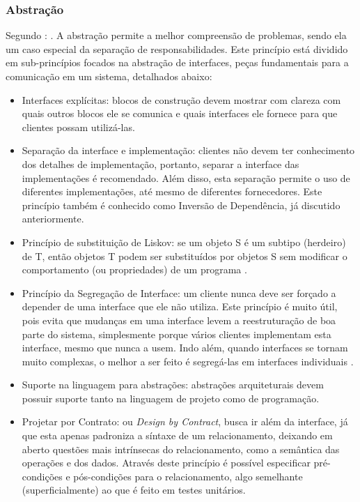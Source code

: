 \documentclass[diss]{template/setrem}
\begin{document}
\subsubsection{Abstração}
Segundo \citet[p. 131]{Vogel2011}: . A abstração permite a melhor compreensão de problemas, sendo ela um caso especial da separação de responsabilidades. Este princípio está dividido em sub-princípios focados na abstração de interfaces, peças fundamentais para a comunicação em um sistema, detalhados abaixo:
\begin{itemize}
	\item Interfaces explícitas: blocos de construção devem mostrar com clareza com quais outros blocos ele se comunica e quais interfaces ele fornece para que clientes possam utilizá-las.
	\item Separação da interface e implementação: clientes não devem ter conhecimento dos detalhes de implementação, portanto, separar a interface das implementações é recomendado. Além disso, esta separação permite o uso de diferentes implementações, até mesmo de diferentes fornecedores. Este princípio também é conhecido como Inversão de Dependência, já discutido anteriormente.
	\item Princípio de substituição de Liskov: se um objeto S é um subtipo (herdeiro) de T, então objetos T podem ser substituídos por objetos S sem modificar o comportamento (ou propriedades) de um programa \citep{Martin1996}.
	\item Princípio da Segregação de Interface: um cliente nunca deve ser forçado a depender de uma interface que ele não utiliza. Este princípio é muito útil, pois evita que mudanças em uma interface levem a reestruturação de boa parte do sistema, simplesmente porque vários clientes implementam esta interface, mesmo que nunca a usem. Indo além, quando interfaces se tornam muito complexas, o melhor a ser feito é segregá-las em interfaces individuais \citep{Martin1996a}.
	\item Suporte na linguagem para abstrações: abstrações arquiteturais devem possuir suporte tanto na linguagem de projeto como de programação.
	\item Projetar por Contrato: ou \emph{Design by Contract}, busca ir além da interface, já que esta apenas padroniza a síntaxe de um relacionamento, deixando em aberto questões mais intrínsecas do relacionamento, como a semântica das operações e dos dados. Através deste princípio é possível especificar pré-condições e pós-condições para o relacionamento, algo semelhante (superficialmente) ao que é feito em testes unitários.
\end{itemize}
\end{document}
